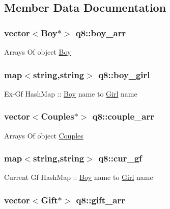 \subsection{Member Data Documentation}
\hypertarget{classq8_a228f7527b4439cddc5a64a61e147460e}{
\subsubsection[{boy\-\_\-arr}]{\setlength{\rightskip}{0pt plus 5cm}vector$<${\bf Boy}$\ast$$>$ q8\-::boy\-\_\-arr}}\label{classq8_a228f7527b4439cddc5a64a61e147460e}
Arrays Of object \hyperlink{class_boy}{Boy} \hypertarget{classq8_acbc59387f21252d37d63af51345c6ec2}{
\subsubsection[{boy\-\_\-girl}]{\setlength{\rightskip}{0pt plus 5cm}map$<$string,string$>$ q8\-::boy\-\_\-girl}}\label{classq8_acbc59387f21252d37d63af51345c6ec2}
Ex-\/\-Gf Hash\-Map \-:\-: \hyperlink{class_boy}{Boy} name to \hyperlink{class_girl}{Girl} name \hypertarget{classq8_a37dccb28c06ce007f4268607a560d801}{
\subsubsection[{couple\-\_\-arr}]{\setlength{\rightskip}{0pt plus 5cm}vector$<${\bf Couples}$\ast$$>$ q8\-::couple\-\_\-arr}}\label{classq8_a37dccb28c06ce007f4268607a560d801}
Arrays Of object \hyperlink{class_couples}{Couples} \hypertarget{classq8_a7b6a9accc8ffe9b590c49e5f4acca483}{
\subsubsection[{cur\-\_\-gf}]{\setlength{\rightskip}{0pt plus 5cm}map$<$string,string$>$ q8\-::cur\-\_\-gf}}\label{classq8_a7b6a9accc8ffe9b590c49e5f4acca483}
Current Gf Hash\-Map \-:\-: \hyperlink{class_boy}{Boy} name to \hyperlink{class_girl}{Girl} name \hypertarget{classq8_a43951e1c68f6e733dab7bc7d6a4becbb}{
\subsubsection[{gift\-\_\-arr}]{\setlength{\rightskip}{0pt plus 5cm}vector$<${\bf Gift}$\ast$$>$ q8\-::gift\-\_\-arr}}\label{classq8_a43951e1c68f6e733dab7bc7d6a4becbb}
